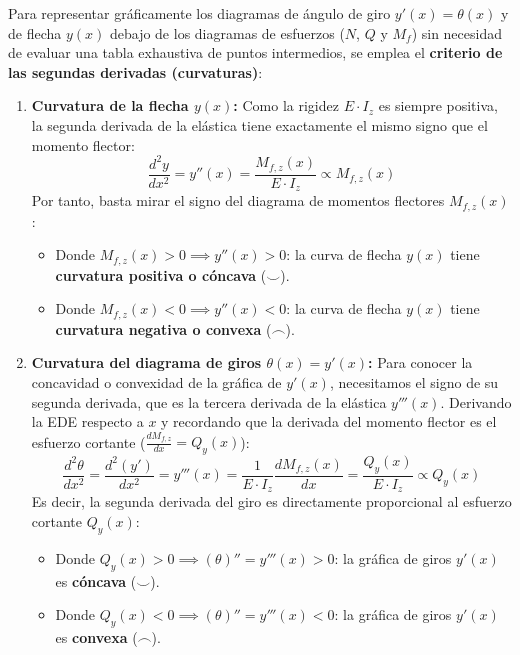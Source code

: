 Para representar gráficamente los diagramas de ángulo de giro $y'(x) = \theta(x)$ y de flecha $y(x)$ debajo de los diagramas de esfuerzos ($N$, $Q$ y $M_f$) sin necesidad de evaluar una tabla exhaustiva de puntos intermedios, se emplea el \textbf{criterio de las segundas derivadas (curvaturas)}:
\begin{enumerate}
    \item \textbf{Curvatura de la flecha $y(x)$:} Como la rigidez $E \cdot I_z$ es siempre positiva, la segunda derivada de la elástica tiene exactamente el mismo signo que el momento flector:
          \begin{equation}
              \frac{d^2 y}{dx^2} = y''(x) = \frac{M_{f,z}(x)}{E \cdot I_z} \propto M_{f,z}(x)
          \end{equation}
          Por tanto, basta mirar el signo del diagrama de momentos flectores $M_{f,z}(x)$:
          \begin{itemize}
              \item Donde $M_{f,z}(x) > 0 \implies y''(x) > 0$: la curva de flecha $y(x)$ tiene \textbf{curvatura positiva o cóncava} ($\smile$).
              \item Donde $M_{f,z}(x) < 0 \implies y''(x) < 0$: la curva de flecha $y(x)$ tiene \textbf{curvatura negativa o convexa} ($\frown$).
          \end{itemize}
    \item \textbf{Curvatura del diagrama de giros $\theta(x) = y'(x)$:} Para conocer la concavidad o convexidad de la gráfica de $y'(x)$, necesitamos el signo de su segunda derivada, que es la tercera derivada de la elástica $y'''(x)$. Derivando la EDE respecto a $x$ y recordando que la derivada del momento flector es el esfuerzo cortante ($\frac{dM_{f,z}}{dx} = Q_y(x)$):
          \begin{equation}
              \frac{d^2 \theta}{dx^2} = \frac{d^2(y')}{dx^2} = y'''(x) = \frac{1}{E \cdot I_z}\frac{dM_{f,z}(x)}{dx} = \frac{Q_y(x)}{E \cdot I_z} \propto Q_y(x)
          \end{equation}
          Es decir, la segunda derivada del giro es directamente proporcional al esfuerzo cortante $Q_y(x)$:
          \begin{itemize}
              \item Donde $Q_y(x) > 0 \implies (\theta)'' = y'''(x) > 0$: la gráfica de giros $y'(x)$ es \textbf{cóncava} ($\smile$).
              \item Donde $Q_y(x) < 0 \implies (\theta)'' = y'''(x) < 0$: la gráfica de giros $y'(x)$ es \textbf{convexa} ($\frown$).

\end{itemize}
\end{enumerate}
